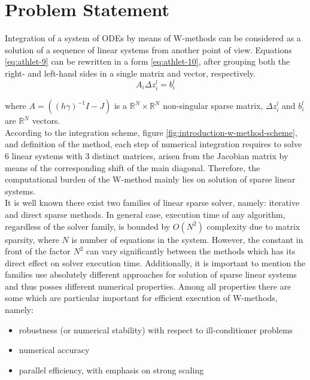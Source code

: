 \chapter{Problem Statement}\label{chapter:problem-statment}


Integration of a system of ODEs by means of W-methods can be considered as a solution of a sequence of linear systems from another point of view. Equations \ref{eq:athlet-9} can be rewritten in a form \ref{eq:athlet-10}, after grouping both the right- and left-hand sides in a single matrix and vector, respectively.\\


\begin{equation} \label{eq:athlet-10}
	A_{i} \Delta z^{l}_{i} =  b^{l}_{i} 
\end{equation}

where $A = ((h \gamma)^{-1}I - J)$ is a $\mathbb{R}^{N} \times \mathbb{R}^{N}$ non-singular sparse matrix, $\Delta z^{l}_{i}$  and $b^{l}_{i}$ are $\mathbb{R}^{N}$ vectors.\\


According to the integration scheme, figure \ref{fig:introduction-w-method-scheme}, and definition of the method, each step of numerical integration requires to solve 6 linear systems with 3 distinct matrices, arisen from the Jacobian matrix by means of the corresponding shift of the main diagonal. Therefore, the computational burden of the W-method mainly lies on solution of sparse linear systems.\\


It is well known there exist two families of linear sparse solver, namely: iterative and direct sparse methods. In general case, execution time of any algorithm, regardless of the solver family, is bounded by $O(N^2)$ complexity due to matrix sparsity, where $N$ is number of equations in the system. However, the constant in front of the factor $N^2$ can vary significantly between the methods which has its direct effect on solver execution time. Additionally, it is important to mention the families use absolutely different approaches for solution of sparse linear systems and thus posses different numerical properties. Among all properties there are some which are particular important for efficient execution of W-methods, namely: \\


\begin{itemize}
	\item robustness (or numerical stability) with respect to ill-conditioner problems
	\item numerical accuracy
	\item parallel efficiency, with emphasis on strong scaling 
\end{itemize}


